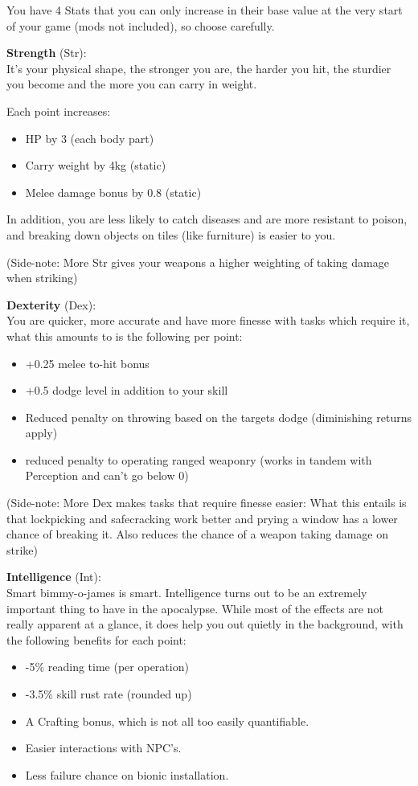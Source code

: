 You have 4 Stats that you can only increase in their base value at the very start of your game (mods not included), so choose carefully.

\textbf{Strength} (Str):\\It's your physical shape, the stronger you are, the harder you hit, the sturdier you become and the more you can carry in weight.

Each point increases:
\begin{itemize}
\item HP by 3 (each body part)
\item Carry weight by 4kg (static)
\item Melee damage bonus by 0.8 (static)
\end{itemize}

In addition, you are less likely to catch diseases and are more resistant to poison, and breaking down objects on tiles (like furniture) is easier to you.

(Side-note: More Str gives your weapons a higher weighting of taking damage when striking)

\textbf{Dexterity} (Dex):\\You are quicker, more accurate and have more finesse with tasks which require it, what this amounts to is the following per point:
\begin{itemize}
\item +0.25 melee to-hit bonus
\item +0.5 dodge level in addition to your skill
\item Reduced penalty on throwing based on the targets dodge (diminishing returns apply)
\item reduced penalty to operating ranged weaponry (works in tandem with Perception and can't go below 0)
\end{itemize}

(Side-note: More Dex makes tasks that require finesse easier: What this entails is that lockpicking and safecracking work better and prying a window has a lower chance of breaking it. Also reduces the chance of a weapon taking damage on strike)

\textbf{Intelligence} (Int):\\Smart bimmy-o-james is smart. Intelligence turns out to be an extremely important thing to have in the apocalypse. While most of the effects are not really apparent at a glance, it does help you out quietly in the background, with the following benefits for each point:
\begin{itemize}
\item -5\% reading time (per operation)
\item -3.5\% skill rust rate (rounded up)
\item A Crafting bonus, which is not all too easily quantifiable.
\item Easier interactions with NPC's.
\item Less failure chance on bionic installation.
\end{itemize}

